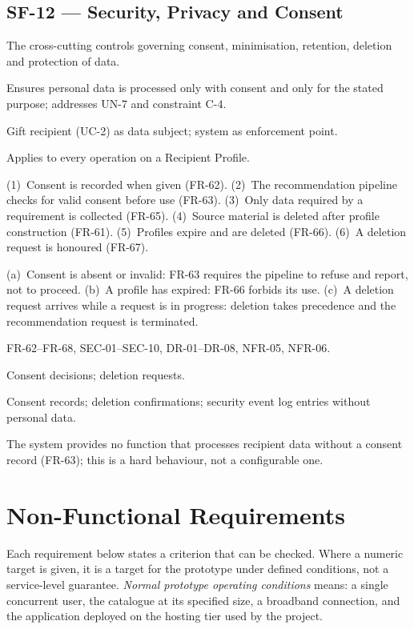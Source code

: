 \documentclass[11pt,a4paper]{report}
\begin{document}
\section{SF-12 --- Security, Privacy and Consent}
\begin{description}[style=nextline,leftmargin=0pt]
\item[Description] The cross-cutting controls governing consent, minimisation, retention, deletion and protection of data.
\item[Purpose] Ensures personal data is processed only with consent and only for the stated purpose; addresses UN-7 and constraint C-4.
\item[Actors] Gift recipient (UC-2) as data subject; system as enforcement point.
\item[Preconditions] Applies to every operation on a Recipient Profile.
\item[Main flow] (1)~Consent is recorded when given (FR-62). (2)~The recommendation pipeline checks for valid consent before use (FR-63). (3)~Only data required by a requirement is collected (FR-65). (4)~Source material is deleted after profile construction (FR-61). (5)~Profiles expire and are deleted (FR-66). (6)~A deletion request is honoured (FR-67).
\item[Alternative and exception flows] (a)~Consent is absent or invalid: FR-63 requires the pipeline to refuse and report, not to proceed. (b)~A profile has expired: FR-66 forbids its use. (c)~A deletion request arrives while a request is in progress: deletion takes precedence and the recommendation request is terminated.
\item[Requirements] FR-62--FR-68, SEC-01--SEC-10, DR-01--DR-08, NFR-05, NFR-06.
\item[Inputs] Consent decisions; deletion requests.
\item[Outputs] Consent records; deletion confirmations; security event log entries without personal data.
\item[Constraints] The system provides no function that processes recipient data without a consent record (FR-63); this is a hard behaviour, not a configurable one.
\end{description}

\chapter{Non-Functional Requirements}
Each requirement below states a criterion that can be checked. Where a numeric target is
given, it is a target for the prototype under defined conditions, not a service-level
guarantee. \emph{Normal prototype operating conditions} means: a single concurrent user, the
catalogue at its specified size, a broadband connection, and the application deployed on the
hosting tier used by the project.
\end{document}
